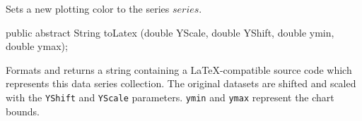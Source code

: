 \begin{tabb}
   Sets a new plotting color to the series $series$.
\end{tabb}
\begin{htmlonly}
\end{htmlonly}
\begin{code}

   public abstract String toLatex (double YScale, double YShift,
                                   double ymin, double ymax);
\end{code}
\begin{tabb}
   Formats and returns a string containing a \LaTeX-compatible source
   code which represents this data series collection. %
   The original datasets are shifted and scaled with the
   \texttt{YShift} and \texttt{YScale} parameters.
   \texttt{ymin} and \texttt{ymax} represent the chart bounds.
\end{tabb}
\begin{htmlonly}
\end{htmlonly}
